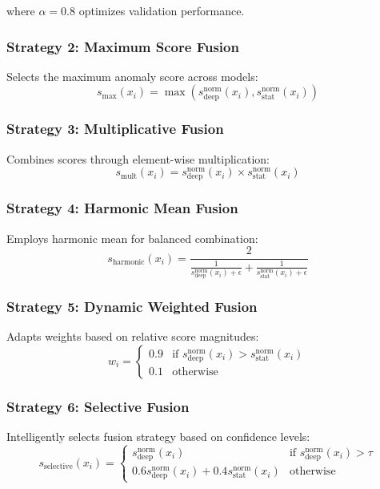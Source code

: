 \documentclass[conference]{IEEEtran}
\begin{document}
where $\alpha = 0.8$ optimizes validation performance.

\subsubsection{Strategy 2: Maximum Score Fusion}
Selects the maximum anomaly score across models:
\begin{equation}
s_{\text{max}}(x_i) = \max(s_{\text{deep}}^{\text{norm}}(x_i), s_{\text{stat}}^{\text{norm}}(x_i))
\end{equation}

\subsubsection{Strategy 3: Multiplicative Fusion}
Combines scores through element-wise multiplication:
\begin{equation}
s_{\text{mult}}(x_i) = s_{\text{deep}}^{\text{norm}}(x_i) \times s_{\text{stat}}^{\text{norm}}(x_i)
\end{equation}

\subsubsection{Strategy 4: Harmonic Mean Fusion}
Employs harmonic mean for balanced combination:
\begin{equation}
s_{\text{harmonic}}(x_i) = \frac{2}{\frac{1}{s_{\text{deep}}^{\text{norm}}(x_i) + \epsilon} + \frac{1}{s_{\text{stat}}^{\text{norm}}(x_i) + \epsilon}}
\end{equation}

\subsubsection{Strategy 5: Dynamic Weighted Fusion}
Adapts weights based on relative score magnitudes:
\begin{equation}
w_i = \begin{cases} 
0.9 & \text{if } s_{\text{deep}}^{\text{norm}}(x_i) > s_{\text{stat}}^{\text{norm}}(x_i) \\
0.1 & \text{otherwise}
\end{cases}
\end{equation}

\subsubsection{Strategy 6: Selective Fusion}
Intelligently selects fusion strategy based on confidence levels:
\begin{equation}
s_{\text{selective}}(x_i) = \begin{cases}
s_{\text{deep}}^{\text{norm}}(x_i) & \text{if } s_{\text{deep}}^{\text{norm}}(x_i) > \tau \\
0.6 s_{\text{deep}}^{\text{norm}}(x_i) + 0.4 s_{\text{stat}}^{\text{norm}}(x_i) & \text{otherwise}
\end{cases}
\end{equation}
\end{document}
